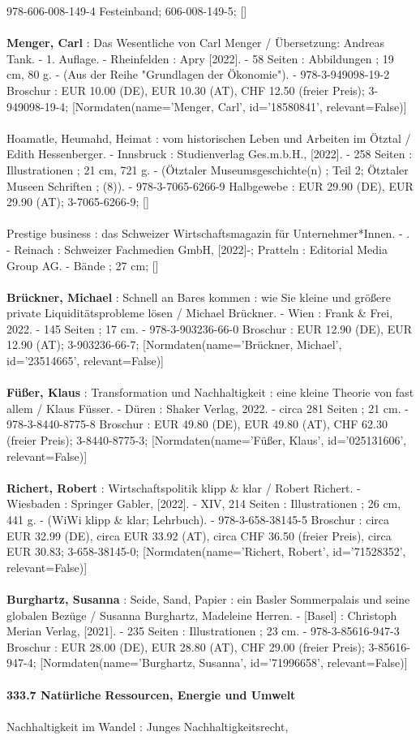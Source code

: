 \documentclass{article}
\begin{document}
\begin{multicols}{3}
978-606-008-149-4 Festeinband; 606-008-149-5; []\\\\\textbf{Menger, Carl} : Das Wesentliche von Carl Menger / Übersetzung: Andreas Tank. - 1. Auflage. - Rheinfelden : Apry [2022]. - 58 Seiten : Abbildungen ; 19 cm, 80 g. - (Aus der Reihe "Grundlagen der Ökonomie"). - 978-3-949098-19-2 Broschur : EUR 10.00 (DE), EUR 10.30 (AT), CHF 12.50 (freier Preis); 3-949098-19-4; [Normdaten(name='Menger, Carl', id='18580841', relevant=False)]\\\\Hoamatle, Heumahd, Heimat : vom historischen Leben und Arbeiten im Ötztal / Edith Hessenberger. - Innsbruck : Studienverlag Ges.m.b.H., [2022]. - 258 Seiten : Illustrationen ; 21 cm, 721 g. - (Ötztaler Museumsgeschichte(n) ; Teil 2; Ötztaler Museen Schriften ; (8)). - 978-3-7065-6266-9 Halbgewebe : EUR 29.90 (DE), EUR 29.90 (AT); 3-7065-6266-9; []\\\\Prestige business : das Schweizer Wirtschaftsmagazin für Unternehmer*Innen. - . - Reinach : Schweizer Fachmedien GmbH, [2022]-; Pratteln : Editorial Media Group AG. - Bände ; 27 cm; []\\\\\textbf{Brückner, Michael} : Schnell an Bares kommen : wie Sie kleine und größere private Liquiditätsprobleme lösen / Michael Brückner. - Wien : Frank \& Frei, 2022. - 145 Seiten ; 17 cm. - 978-3-903236-66-0 Broschur : EUR 12.90 (DE), EUR 12.90 (AT); 3-903236-66-7; [Normdaten(name='Brückner, Michael', id='23514665', relevant=False)]\\\\\textbf{Füßer, Klaus} : Transformation und Nachhaltigkeit : eine kleine Theorie von fast allem / Klaus Füsser. - Düren : Shaker Verlag, 2022. - circa 281 Seiten ; 21 cm. - 978-3-8440-8775-8 Broschur : EUR 49.80 (DE), EUR 49.80 (AT), CHF 62.30 (freier Preis); 3-8440-8775-3; [Normdaten(name='Füßer, Klaus', id='025131606', relevant=False)]\\\\\textbf{Richert, Robert} : Wirtschaftspolitik klipp \& klar / Robert Richert. - Wiesbaden : Springer Gabler, [2022]. - XIV, 214 Seiten : Illustrationen ; 26 cm, 441 g. - (WiWi klipp \& klar; Lehrbuch). - 978-3-658-38145-5 Broschur : circa EUR 32.99 (DE), circa EUR 33.92 (AT), circa CHF 36.50 (freier Preis), circa EUR 30.83; 3-658-38145-0; [Normdaten(name='Richert, Robert', id='71528352', relevant=False)]\\\\\textbf{Burghartz, Susanna} : Seide, Sand, Papier : ein Basler Sommerpalais und seine globalen Bezüge / Susanna Burghartz, Madeleine Herren. - [Basel] : Christoph Merian Verlag, [2021]. - 235 Seiten : Illustrationen ; 23 cm. - 978-3-85616-947-3 Broschur : EUR 28.00 (DE), EUR 28.80 (AT), CHF 29.00 (freier Preis); 3-85616-947-4; [Normdaten(name='Burghartz, Susanna', id='71996658', relevant=False)]\\\\\textbf{333.7 Natürliche Ressourcen, Energie und Umwelt}\\\\Nachhaltigkeit im Wandel : Junges Nachhaltigkeitsrecht, 
\end{multicols}
\end{document}
